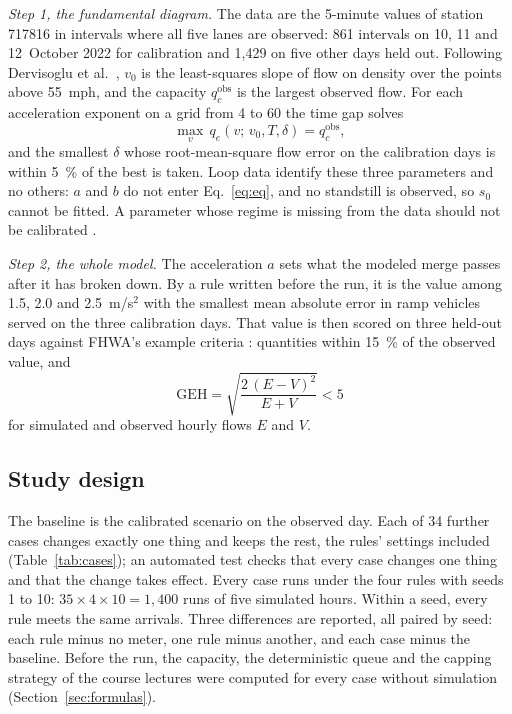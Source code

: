 \documentclass[11pt,letterpaper]{article}
\begin{document}
\emph{Step 1, the fundamental diagram.} The data are the 5-minute values of station
717816 in intervals where all five lanes are observed: 861 intervals on 10, 11 and
12~October 2022 for calibration and 1{,}429 on five other days held out. Following
Dervisoglu et al.\ \cite{dervisoglu2009}, $v_0$ is the least-squares slope of flow on
density over the points above 55~mph, and the capacity $q^\text{obs}_c$ is the largest
observed flow. For each acceleration exponent on a grid from 4 to 60 the time gap
solves
\begin{equation}
\max_v\,q_e(v;\,v_0,T,\delta)=q^\text{obs}_c ,
\label{eq:capmatch}
\end{equation}
and the smallest $\delta$ whose root-mean-square flow error on the calibration days is
within 5~\% of the best is taken. Loop data identify these three parameters and no
others: $a$ and $b$ do not enter Eq.~\eqref{eq:eq}, and no standstill is observed, so
$s_0$ cannot be fitted. A parameter whose regime is missing from the data should not be
calibrated \cite{treiberkesting2013cal}.

\emph{Step 2, the whole model.} The acceleration $a$ sets what the modeled merge passes
after it has broken down. By a rule written before the run, it is the value among 1.5,
2.0 and 2.5~m/s$^2$ with the smallest mean absolute error in ramp vehicles served on
the three calibration days. That value is then scored on three held-out days against
FHWA's example criteria \cite{fhwa2004}: quantities within 15~\% of the observed value,
and
\begin{equation}
\mathrm{GEH}=\sqrt{\frac{2\,(E-V)^2}{E+V}}<5
\label{eq:geh}
\end{equation}
for simulated and observed hourly flows $E$ and $V$.

\subsection{Study design}\label{sec:design}

The baseline is the calibrated scenario on the observed day. Each of 34 further cases
changes exactly one thing and keeps the rest, the rules' settings included
(Table~\ref{tab:cases}); an automated test checks that every case changes one thing and
that the change takes effect. Every case runs under the four rules with seeds 1 to 10:
$35\times4\times10=1{,}400$ runs of five simulated hours. Within a seed, every rule
meets the same arrivals. Three differences are reported, all paired by seed: each rule
minus no meter, one rule minus another, and each case minus the baseline. Before the
run, the capacity, the deterministic queue and the capping strategy of the course
lectures \cite{ma2026} were computed for every case without simulation
(Section~\ref{sec:formulas}).
\end{document}
